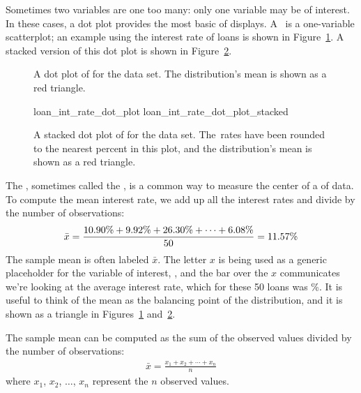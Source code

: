 Sometimes two variables are one too many:
only one variable may be of interest.
In these cases, a dot plot provides the most basic of displays.
A~ is a one-variable scatterplot;
an example using the interest rate of \loanN{} loans
is shown in Figure~\ref{loan_int_rate_dot_plot}.
A stacked version of this dot plot is shown in
Figure~\ref{loan_int_rate_dot_plot_stacked}.

\begin{figure}[h]
  \centering
  \caption{A dot plot of 
      for the  data set.
      The distribution's mean is shown as a red triangle.}
  \label{loan_int_rate_dot_plot}
\end{figure}

\begin{figure}[h]
  \centering
      {loan_int_rate_dot_plot}
      {loan_int_rate_dot_plot_stacked}
  \caption{A stacked dot plot of
      for the  data set.
      The~rates have been rounded to the nearest
      percent in this plot, and the
      distribution's mean is shown as a red triangle.}
  \label{loan_int_rate_dot_plot_stacked}
\end{figure}

The , sometimes called the
, is a common way
to measure the center of a  of data.
To compute the mean interest rate, we add up all the interest
rates and divide by the number of observations:
\begin{align*}
\bar{x}
    = \frac{\text{10.90\%} + \text{9.92\%} + \text{26.30\%} +
        \cdots + \text{6.08\%}}{50{}}
    = 11.57{}\%
\end{align*}
The sample mean is often labeled $\bar{x}$.
The letter $x$ is being used as a generic placeholder
for the variable of interest, ,
and the bar over the $x$ communicates we're looking at the
average interest rate, which for these 50 loans was \loanAvg{}\%.
It is useful to think of the mean as the balancing point
of the distribution, and it is shown as a triangle in Figures~\ref{loan_int_rate_dot_plot}
and~\ref{loan_int_rate_dot_plot_stacked}.

\begin{termBox}{%
The sample mean can be computed as the sum of the
observed values divided by the number of observations:
\begin{align*}
\bar{x} = \frac{x_1 + x_2 + \cdots + x_n}{n}
\end{align*}
where $x_1$, $x_2$, $\dots$, $x_n$ represent
the $n$ observed values.}
\end{termBox}

